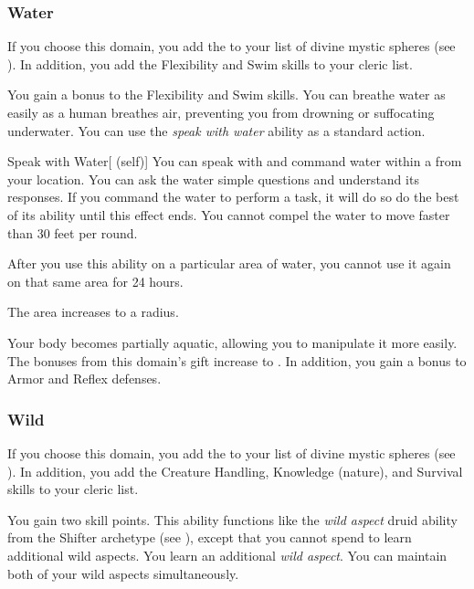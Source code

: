         \subsubsection{Water}
            If you choose this domain, you add the   to your list of divine mystic spheres (see ).
            In addition, you add the Flexibility and Swim skills to your cleric  list.

             You gain a  bonus to the Flexibility and Swim skills.
             You can breathe water as easily as a human breathes air, preventing you from drowning or suffocating underwater.
             You can use the \textit{speak with water} ability as a standard action.
            \begin{attuneability}{Speak with Water}[ (self)]
                You can speak with and command water within a \areahuge {} from your location.
                You can ask the water simple questions and understand its responses.
                If you command the water to perform a task, it will do so do the best of its ability until this effect ends.
                You cannot compel the water to move faster than 30 feet per round.

                After you use this ability on a particular area of water, you cannot use it again on that same area for 24 hours.

                \rankline
                 The area increases to a \areagarg radius.
            \end{attuneability}
             Your body becomes partially aquatic, allowing you to manipulate it more easily.
            The bonuses from this domain's gift increase to .
            In addition, you gain a  bonus to Armor and Reflex defenses.

        \subsubsection{Wild}
            If you choose this domain, you add the   to your list of divine mystic spheres (see ).
            In addition, you add the Creature Handling, Knowledge (nature), and Survival skills to your cleric  list.

             You gain two skill points.
             This ability functions like the \textit{wild aspect} druid ability from the Shifter archetype (see ), except that you cannot spend  to learn additional wild aspects.
             You learn an additional \textit{wild aspect}.
             You can maintain both of your wild aspects simultaneously.

